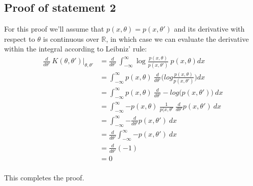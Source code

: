 \documentclass[paper=a4, fontsize=11pt]{scrartcl} %
\numberwithin{equation}{section} %
\numberwithin{figure}{section} %
\numberwithin{table}{section} %
\begin{document}
\subsection{Proof of statement 2}
For this proof we'll assume that $p(x,\theta) = p(x,\theta')$ and its derivative with respect to $\theta$ is continuous over $\mathds{R}$, in which case we can evaluate the derivative within the integral according to Leibniz' rule:
\begin{equation}
\begin{aligned} 
	\frac{d}{d\theta'}\ K(\theta,\theta')|_{\theta,\theta'} &= \frac{d}{d\theta'}\ \int_{-\infty}^{\infty}{\log{\frac{p(x,\theta)}{p(x,\theta')}}\ p(x, \theta)dx} \\
	&= \int_{-\infty}^{\infty}{p(x, \theta)\ \frac{d}{d\theta'} \Bigg(log{\frac{p(x,\theta)}{p(x,\theta')}}\Bigg) dx} \\
	&= \int_{-\infty}^{\infty}{p(x, \theta)\ \frac{d}{d\theta'} -log{(p(x,\theta')})\ dx} \\
	&= \int_{-\infty}^{\infty}{-p(x, \theta)\ \frac{1}{p(x,\theta'}\ \frac{d}{d\theta'} p(x,\theta')\ dx} \\
	&= \int_{-\infty}^{\infty}{-\frac{d}{d\theta'} p(x,\theta')\ dx} \\
	&= \frac{d}{d\theta'} \int_{-\infty}^{\infty}{-p(x,\theta')\ dx} \\
	&= \frac{d}{d\theta'} (-1) \\
	&= 0
\end{aligned}
\end{equation}
\\
This completes the proof.
\end{document}
